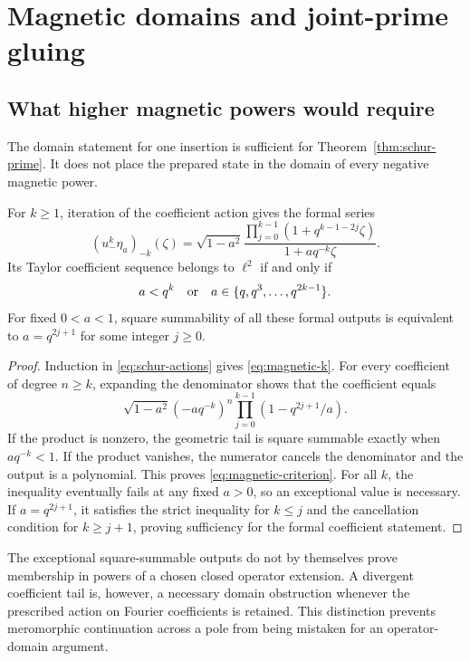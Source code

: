 \section{Magnetic domains and joint-prime gluing}\label{sec:gluing}
\subsection{What higher magnetic powers would require}
The domain statement for one insertion is sufficient for
Theorem~\ref{thm:schur-prime}. It does not place the prepared state in
the domain of every negative magnetic power.
\begin{proposition}
\label{prop:magnetic-powers}
For $k\geq1$, iteration of the coefficient action gives the formal series
\begin{equation}\label{eq:magnetic-k}
 (u_-^k\eta_a)_{-k}(\zeta)=\sqrt{1-a^2}
 \frac{\prod_{j=0}^{k-1}(1+q^{k-1-2j}\zeta)}{1+aq^{-k}\zeta}.
\end{equation}
Its Taylor coefficient sequence belongs to $\ell^2$ if and only if
\begin{equation}\label{eq:magnetic-criterion}
 a<q^k\quad\hbox{or}\quad a\in\{q,q^3,\ldots,q^{2k-1}\}.
\end{equation}
For fixed $0<a<1$, square summability of all these formal outputs is
equivalent to $a=q^{2j+1}$ for some integer $j\geq0$.
\end{proposition}
\begin{proof}
Induction in \eqref{eq:schur-actions} gives \eqref{eq:magnetic-k}.
For every coefficient of degree $n\geq k$, expanding the denominator
shows that the coefficient equals
\begin{equation}\label{eq:magnetic-tail}
 \sqrt{1-a^2}(-aq^{-k})^n
 \prod_{j=0}^{k-1}(1-q^{2j+1}/a).
\end{equation}
If the product is nonzero, the geometric tail is square summable
exactly when $aq^{-k}<1$. If the product vanishes, the numerator
cancels the denominator and the output is a polynomial. This proves
\eqref{eq:magnetic-criterion}. For all $k$, the inequality eventually
fails at any fixed $a>0$, so an exceptional value is necessary.
If $a=q^{2j+1}$, it satisfies the strict inequality for $k\leq j$
and the cancellation condition for $k\geq j+1$, proving sufficiency
for the formal coefficient statement.
\end{proof}

The exceptional square-summable outputs do not by themselves prove
membership in powers of a chosen closed operator extension. A divergent
coefficient tail is, however, a necessary domain obstruction whenever
the prescribed action on Fourier coefficients is retained. This
distinction prevents meromorphic continuation across a pole from being
mistaken for an operator-domain argument.

